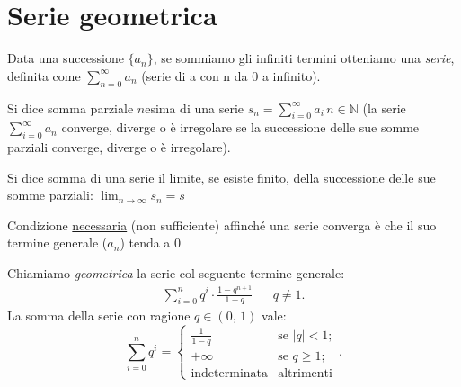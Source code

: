     \section{Serie geometrica}
    \begin{defn}[Serie]
        Data una successione $\{a_{n}\}$, se sommiamo gli infiniti termini otteniamo una \textit{serie}, definita come $\sum_{n=0}^{\infty} a_n$ (serie di a con n da 0 a infinito).

        Si dice somma parziale $n$\nbdash esima di una serie $s_{n}=\sum_{i=0}^{\infty} a_i\,n \in \mathbb{N}$ (la serie $\sum_{i=0}^{\infty} a_n$ converge, diverge o è irregolare se la successione delle sue somme parziali converge, diverge o è irregolare).

        Si dice somma di una serie il limite, se esiste finito, della successione delle sue somme parziali: $\lim_{n \to \infty} s_n = s$

        Condizione \underline{necessaria} (non sufficiente) affinché una serie converga è che il suo termine generale ($a_n$) tenda a 0
    \end{defn}
    \begin{defn}\label{defn:Serie_geometrica}
        Chiamiamo \textit{geometrica} la serie col seguente termine generale:
        \begin{align*}
            \sum_{i=0}^{n} q^{i} \cdot \frac{1 - q^{n+1}}{1 - q} & &q\neq 1
        .\end{align*}
        La somma della serie con ragione $q \in (0,\,1)$ vale: \[
            \sum_{i=0}^{n} q^{i} = \begin{cases}
                \frac{1}{1-q} & \text{se $|q| < 1$}; \\
                +\infty & \text{se $q \geq 1$}; \\
                \text{indeterminata} & \text{altrimenti}
            \end{cases}
        .\] 
    \end{defn}
